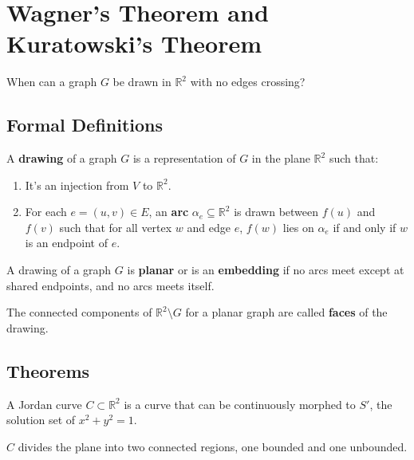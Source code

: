 \chapter{Wagner's Theorem and Kuratowski's Theorem}

\begin{question}
	When can a graph $G$ be drawn in $\mathbb R^2$ with no edges crossing?
\end{question}

\section{Formal Definitions}

\begin{definition}
	A \textbf{drawing} of a graph $G$ is a representation of $G$ in the plane $\mathbb R^2$ such that:
	\begin{enumerate}
		\item It's an injection from $V$ to $\mathbb R^2$.
		\item For each $e= (u,v)\in E$, an \textbf{arc} $\alpha_e\subseteq \mathbb R^2$ is drawn between $f(u)$ and $f(v)$ such that for all vertex $w$ and edge $e$,
		      $f(w)$ lies on $\alpha_e$ if and only if $w$ is an endpoint of $e$.
	\end{enumerate}
\end{definition}

\begin{definition}
	A drawing of a graph $G$ is \textbf{planar} or is an \textbf{embedding} if no arcs meet except at shared endpoints, and no arcs meets itself.

	The connected components of $\mathbb R^2\setminus G$ for a planar graph are called \textbf{faces} of the drawing.
\end{definition}

\section{Theorems}

\begin{theorem}
	A Jordan curve $C\subset \mathbb R^2$ is a curve that can be continuously morphed to $S'$, the solution set of $x^2+y^2=1$.

	$C$ divides the plane into two connected regions, one bounded and one unbounded.
\end{theorem}

